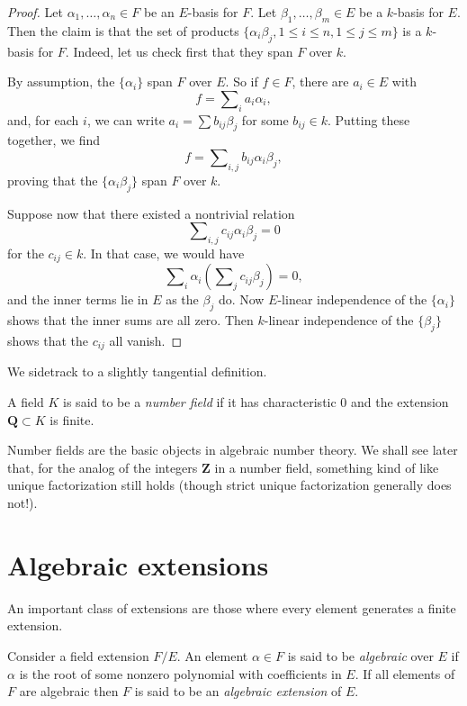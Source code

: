 \begin{proof}
Let $\alpha_1, \ldots, \alpha_n \in F$ be an $E$-basis for $F$. Let
$\beta_1, \ldots, \beta_m \in E$ be a $k$-basis for $E$. Then the claim is
that the set of products
$\{\alpha_i \beta_j, 1 \leq i \leq n, 1 \leq j \leq m\}$
is a $k$-basis for $F$. Indeed, let us check first that they span $F$ over $k$.

\medskip\noindent
By assumption, the $\{\alpha_i\}$ span $F$ over $E$. So if
$f \in F$, there are $a_i \in E$ with
$$
f = \sum\nolimits_i a_i \alpha_i,
$$
and, for each $i$, we can write $a_i = \sum b_{ij} \beta_j$ for some
$b_{ij} \in k$. Putting these together, we find
$$
f = \sum\nolimits_{i,j} b_{ij} \alpha_i \beta_j,
$$
proving that the $\{\alpha_i \beta_j\}$ span $F$ over $k$.

\medskip\noindent
Suppose now that there existed a nontrivial relation
$$
\sum\nolimits_{i,j} c_{ij} \alpha_i \beta_j = 0
$$
for the $c_{ij} \in k$. In that case, we would have
$$
\sum\nolimits_i \alpha_i \left( \sum\nolimits_j c_{ij} \beta_j \right) = 0,
$$
and the inner terms lie in $E$ as the $\beta_j$ do. Now $E$-linear
independence of the $\{\alpha_i\}$ shows that the inner sums are all zero.
Then $k$-linear independence of the $\{\beta_j\}$ shows that the
$c_{ij}$ all vanish.
\end{proof}

\noindent
We sidetrack to a slightly tangential definition.

\begin{definition}
\label{definition-number-field}
A field $K$ is said to be a {\it number field} if it has characteristic
$0$ and the extension $\mathbf{Q} \subset K$ is finite.
\end{definition}

\noindent
Number fields are the basic objects in algebraic number theory. We shall see
later that,
for the analog of the integers $\mathbf{Z}$ in a number field, something kind
of like unique factorization still holds (though strict unique factorization
generally does not!).


\section{Algebraic extensions}
\label{section-algebraic-extensions}

\noindent
An important class of extensions are those where every element generates
a finite extension.

\begin{definition}
\label{definition-algebraic}
Consider a field extension $F/E$. An element $\alpha \in F$ is said to be
{\it algebraic} over $E$ if $\alpha$ is the root of some nonzero polynomial
with coefficients in $E$. If all elements of $F$ are algebraic then $F$ is
said to be an {\it algebraic extension} of $E$.
\end{definition}

